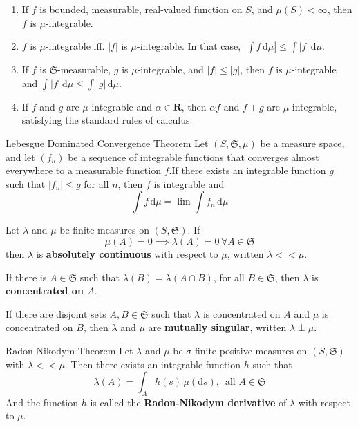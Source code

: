 \begin{enumerate}
	\item If $f$ is bounded, measurable, real-valued function on $S$, and $\mu(S) < \infty$, then $f$ is $\mu$-integrable.
	\item $f$ is $\mu$-integrable iff. $|f|$ is $\mu$-integrable. In that case, $| \int f \, \mathrm{d}\mu| \leq \int |f| \, \mathrm{d}\mu$.
	\item If $f$ is $\mathfrak{S}$-measurable, $g$ is $\mu$-integrable, and $|f| \leq |g|$, then $f$ is $\mu$-integrable and $\int |f| \, \mathrm{d}\mu \leq \int |g| \, \mathrm{d}\mu$.
	\item If $f$ and $g$ are $\mu$-integrable and $\alpha \in \textbf{R}$, then $\alpha f$ and $f + g$ are $\mu$-integrable, satisfying the standard rules of calculus.
\end{enumerate}

\begin{theorem}[]{Lebesgue Dominated Convergence Theorem}{}
	Let $(S, \mathfrak{S}, \mu)$ be a measure space, and let $(f_n)$ be a sequence of integrable functions that converges almost everywhere to a measurable function $f$.If there exists an integrable function $g$ such that $|f_n| \leq g$ for all $n$, then $f$ is integrable and
	\[
		\int f \, \mathrm{d}\mu = \lim \int f_n \, \mathrm{d}\mu
	\]
\end{theorem}

\begin{definition}[]{}{}
	Let $\lambda$ and $\mu$ be finite measures on $(S, \mathfrak{S})$. If
	\[
		\mu(A) = 0 \implies \lambda(A) = 0 \, \forall A \in \mathfrak{S}
	\]
	then $\lambda$ is \textbf{absolutely continuous} with respect to $\mu$, written $\lambda << \mu$. 

	If there is $A \in \mathfrak{S}$ such that $\lambda(B) = \lambda(A \cap B)$, for all $B \in \mathfrak{S}$, then $\lambda$ is \textbf{concentrated on $A$}.

	If there are disjoint sets $A, B \in \mathfrak{S}$ such that $\lambda$ is concentrated on $A$ and $\mu$ is concentrated on $B$, then $\lambda$ and $\mu$ are \textbf{mutually singular}, written $\lambda \perp \mu$.
\end{definition}

\begin{theorem}[]{Radon-Nikodym Theorem}
	Let $\lambda$ and $\mu$ be $\sigma$-finite positive measures on $(S, \mathfrak{S})$ with $\lambda << \mu$. Then there exists an integrable function $h$ such that
	\[
		\lambda(A) = \int_A h(s) \, \mu(\mathrm{d}s), \, \text{ all } A \in \mathfrak{S}
	\]
	And the function $h$ is called the \textbf{Radon-Nikodym derivative} of $\lambda$ with respect to $\mu$.
\end{theorem}

